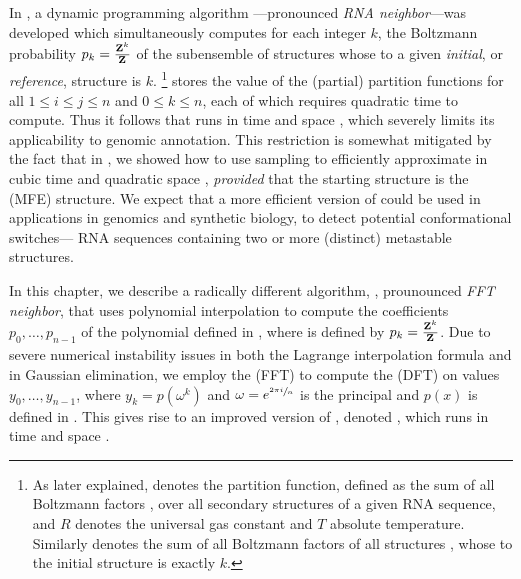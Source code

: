 \documentclass[11pt, oneside]{Thesis} %
\begin{document}
In \citep{freyhult.b07}, a dynamic programming algorithm
\rnabor---pronounced {\em RNA neighbor}---was developed which simultaneously
computes for
each integer $k$, the Boltzmann probability $p_k = \frac{{\bf Z}^{k}_{}}{{\bf Z}^{}_{}}$
of the subensemble of structures
whose \bpd to a given {\em initial}, or
{\em reference}, structure \strSt is $k$.
\footnote{As later
explained, \fullZ denotes the partition function, defined as the sum of
all Boltzmann factors \boltzf{\str}, over all secondary structures \str
of a given RNA sequence, and $R$ denotes the universal
gas constant and $T$ absolute temperature. Similarly  denotes the
sum of all Boltzmann factors of all structures \str, whose \bpd
to the initial structure \strSt is exactly $k$.}
\rnabor stores the value of the (partial)
partition functions  for all $1 \leq i \leq j \leq n$ and
$0 \leq k \leq n$, each of which requires quadratic time to compute.
Thus it follows that \rnabor runs in time  and space
, which severely limits its applicability to genomic annotation.
This restriction is somewhat mitigated by the fact that
in \citep{cloteloulorenz}, we showed how to use sampling
\citep{ding.nar03} to efficiently approximate
\rnabor in cubic time  and quadratic space ,
{\em provided} that the starting structure \strSt is the \mfe
(MFE) structure. We expect that a more efficient version of
\rnabor could be used in applications in genomics and synthetic
biology, to detect potential conformational switches---
RNA sequences containing two or more (distinct) metastable structures.

In this chapter, we describe a radically different algorithm, \fftbor
\citep{senter.po12},
prounounced {\em FFT neighbor},
that uses polynomial interpolation to compute the
coefficients $p_0,\ldots,p_{n-1}$ of the polynomial defined in
,
where \pk is defined by $p_k = \frac{{\bf Z}^{k}_{}}{{\bf Z}^{}_{}}$.
Due to severe numerical instability issues in both the Lagrange
interpolation formula and in Gaussian elimination, we employ
the \fft (FFT) to compute the \idft (DFT) on values $y_0,\ldots,y_{n-1}$,
where $y_k = p(\omega^k)$ and
$\omega = e^{\sfrac{2 \pi i}{n}}$ is the principal \nRoU and
$p(x)$ is defined in . This
gives rise to an improved version of \rnabor, denoted \fftbor,
which runs in time  and space .
\end{document}
